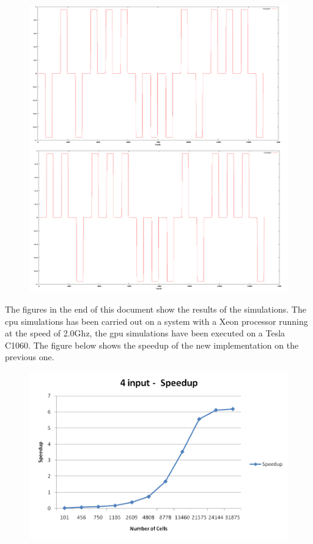 \begin{figure} [h!]
\centering
\includegraphics[scale=0.2]{img/result.png}
\label{graph5}
\end{figure}

The figures in the end of this document show the results of the simulations. The cpu simulations has been carried out on a system with a Xeon processor running at the speed of 2.0Ghz, the gpu simulations have been executed on a Tesla C1060. The figure below shows the speedup of the new implementation on the previous one. 

\begin{figure}
\centering
\includegraphics[scale=0.6]{img/speed.png}
\label{graph5}
\end{figure}

